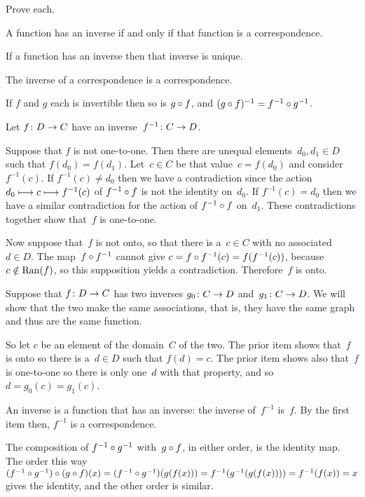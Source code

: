 \documentclass{test}  %
\begin{document}
\begin{ex} \label{PropertiesOfInverses}
Prove each.
\begin{exes}
\item A function has an inverse if and only if that 
  function is a correspondence.
\item If a function has an inverse then that inverse
  is unique.
\item The inverse of a correspondence is a correspondence.  
\item If $f$ and $g$ each is invertible then so is 
  $g\mathbin{\circ} f$, and $(g\mathbin{\circ} f)^{-1}=f^{-1}\mathbin{\circ} g^{-1}$.
\end{exes}
\begin{ans}
\begin{exes}
\item Let $\mbox{$f\colon D\to C$}$ have an inverse~$\mbox{$f^{-1}\colon C\to D$}$.

  Suppose that $f$ is not one-to-one.
  Then there are unequal elements~$d_0,d_1\in D$
  such that $f(d_0)=f(d_1)$.
  Let~$c\in C$ be that value~$c=f(d_0)$ and consider~$f^{-1}(c)$.
  If $f^{-1}(c)\neq d_0$ then we have a contradiction since the 
  action $d_0\stackrel{}{\longmapsto}c\stackrel{}{\longmapsto}f^{-1}(c)$
  of $f^{-1}\mathbin{\circ} f$ is not the identity on~$d_0$.
  If $f^{-1}(c)=d_0$ then we have a similar contradiction for the
  action of $f^{-1}\mathbin{\circ} f$ on~$d_1$.
  These contradictions together show that~$f$ is one-to-one.
   
  Now suppose that~$f$ is not onto,
  so that there is a~$c\in C$ with no associated~$d\in D$.
  The map~$f\mathbin{\circ} f^{-1}$
  cannot give $c=f\mathbin{\circ} f^{-1}(c)=f(f^{-1}(c))$, 
  because $c\notin\operatorname{Ran}(f)$, so this supposition yields a contradiction.
  Therefore~$f$ is onto.
\item Suppose that $\mbox{$f\colon D\to C$}$ has two inverses $\mbox{$g_0\colon C\to D$}$
  and~$\mbox{$g_1\colon C\to D$}$.
  We will show that the two make the same associations, that is, they 
  have the same graph and
  thus are the same function.

  So let $c$ be an element of the domain~$C$ of the two.
  The prior item shows that~$f$ is onto so there is a~$d\in D$ such that
  $f(d)=c$.
  The prior item shows also that~$f$ is one-to-one so there is only 
  one~$d$ with that property, and so $d=g_0(c)=g_1(c)$.
\item An inverse is a function that has an inverse: the inverse of~$f^{-1}$
  is~$f$.
  By the first item then, $f^{-1}$ is a correspondence.
\item The composition of $f^{-1}\mathbin{\circ} g^{-1}$ with~$g\mathbin{\circ} f$,
  in either order, is the identity map.
  The order this way  
  $(f^{-1}\mathbin{\circ} g^{-1})\mathbin{\circ} (g\mathbin{\circ} f)(x)
  =(f^{-1}\mathbin{\circ} g^{-1})(g(f(x)))
  =f^{-1}(g^{-1}(g(f(x))))
  =f^{-1}(f(x))=x$
  gives the identity,
  and the other order is similar.
\end{exes}
\end{ans}
\end{ex}
\end{document}

